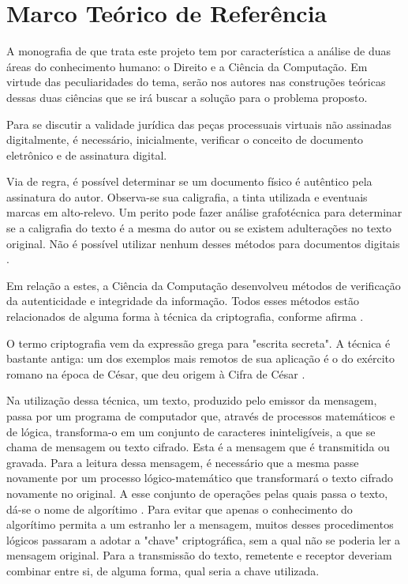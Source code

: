\chapter{Marco Teórico de Referência}

  A monografia de que trata este projeto tem por característica a
  análise de duas áreas do conhecimento humano: o Direito e a
  Ciência da Computação. Em virtude das peculiaridades do tema,
  serão nos autores nas construções teóricas dessas duas ciências
  que se irá buscar a solução para o problema proposto.\par

  Para se discutir a validade jurídica das peças processuais
  virtuais não assinadas digitalmente, é necessário,
  inicialmente, verificar o conceito de documento eletrônico e de
  assinatura digital.\par

  Via de regra, é possível determinar se um documento físico é
  autêntico pela assinatura do autor. Observa-se sua caligrafia,
  a tinta utilizada e eventuais marcas em alto-relevo. Um perito
  pode fazer análise grafotécnica para determinar se a caligrafia
  do texto é a mesma do autor ou se existem adulterações no texto
  original. Não é possível utilizar nenhum desses métodos para
  documentos digitais \cite{ComputerNetworks, CertificadoDigital}.\par

  Em relação a estes, a Ciência da Computação desenvolveu métodos
  de verificação da autenticidade e integridade da informação.
  Todos esses métodos estão relacionados de alguma forma à
  técnica da criptografia, conforme afirma
  .\par

  O termo criptografia vem da expressão grega para "escrita
  secreta". A técnica é bastante antiga: um dos exemplos mais
  remotos de sua aplicação é o do exército romano na época de
  César, que deu origem à Cifra de César \cite[p.
  555]{ComputerNetworks}.\par

  Na utilização dessa técnica, um texto, produzido pelo emissor da
  mensagem, passa por um programa de computador que, através de
  processos matemáticos e de lógica, transforma-o em um conjunto de
  caracteres ininteligíveis, a que se chama de mensagem ou texto
  cifrado.  Esta é a mensagem que é transmitida ou gravada. Para
  a leitura dessa mensagem, é necessário que a mesma passe
  novamente por um processo lógico-matemático que transformará o
  texto cifrado novamente no original. A esse conjunto de
  operações pelas quais passa o texto, dá-se o nome de
  algorítimo \cite{ComputerNetworks}. Para evitar que apenas o
  conhecimento do algorítimo permita a um estranho ler a
  mensagem, muitos desses procedimentos lógicos passaram a adotar
  a "chave" criptográfica, sem a qual não se poderia ler a
  mensagem original. Para a transmissão do texto, remetente e
  receptor deveriam combinar entre si, de alguma forma, qual
  seria a chave utilizada.\par

